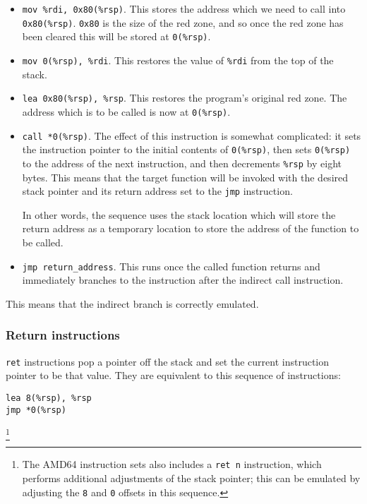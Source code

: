 \begin{itemize}
\item \texttt{mov \%rdi, 0x80(\%rsp)}.  This stores the address which
  we need to call into \texttt{0x80(\%rsp)}.  \texttt{0x80} is the
  size of the red zone, and so once the red zone has been cleared this
  will be stored at \texttt{0(\%rsp)}.
\item \texttt{mov 0(\%rsp), \%rdi}.  This restores the value of
  \texttt{\%rdi} from the top of the stack.
\item \texttt{lea 0x80(\%rsp), \%rsp}.  This restores the program's
  original red zone.  The address which is to be called is now at
  \texttt{0(\%rsp)}.
\item \texttt{call *0(\%rsp)}.  The effect of this instruction is
  somewhat complicated: it sets the instruction pointer to the initial
  contents of \texttt{0(\%rsp)}, then sets \texttt{0(\%rsp)} to the address
  of the next instruction, and then decrements \texttt{\%rsp} by eight
  bytes.  This means that the target function will be invoked with the
  desired stack pointer and its return address set to the \texttt{jmp}
  instruction.

  In other words, the sequence uses the stack location which will
  store the return address as a temporary location to store the
  address of the function to be called.
\item \texttt{jmp return\_address}.  This runs once the called function
  returns and immediately branches to the instruction after the
  indirect call instruction.
\end{itemize}

This means that the indirect branch is correctly emulated.

\subsubsection{Return instructions}

\texttt{ret} instructions pop a pointer off the stack and set the
current instruction pointer to be that value.  They are equivalent to
this sequence of instructions:

\begin{verbatim}
lea 8(%rsp), %rsp
jmp *0(%rsp)
\end{verbatim}\footnote{The AMD64 instruction sets also includes a \texttt{ret n} instruction, which performs additional adjustments of the stack pointer; this can be emulated by adjusting the \texttt{8} and \texttt{0} offsets in this sequence.}


